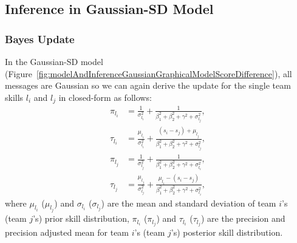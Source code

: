 \subsection{Inference in Gaussian-SD Model}

\subsubsection{Bayes Update} 
In the Gaussian-SD model
(Figure~\ref{fig:modelAndInferenceGaussianGraphicalModelScoreDifference}),
all messages are Gaussian so we can again derive the update
for the single team skills $l_i$ and $l_j$ in closed-form
as follows:
\begin{align}
  \pi_{l_{i}}  &=  \frac{1}{\sigma_{l_{i}}^2} + \frac{1}{\beta_1^2+\beta_2^2+\gamma^2+\sigma_{l_{j}}^2},  \nonumber \\
  \tau_{l_{i}} &=    \frac{\mu_{l_{i}}}{\sigma_{l_{i}}^2} + \frac{(s_i-s_j)+\mu_{l_{j}}}{\beta_1^2+\beta_2^2+\gamma^2+\sigma_{l_{j}}^2}, \nonumber    \\
  \pi_{l_{j}}  &=    \frac{1}{\sigma_{l_{j}}^2} + \frac{1}{\beta_1^2+\beta_2^2+\gamma^2+\sigma_{l_{i}}^2}, \nonumber \\
  \tau_{l_{j}} &=    \frac{\mu_{l_{j}}}{\sigma_{l_{j}}^2} + \frac{\mu_{l_{i}}-(s_i-s_j)}{\beta_1^2+\beta_2^2+\gamma^2+\sigma_{l_{i}}^2},
 \end{align}
where $\mu_{l_i}$ ($\mu_{l_j}$) and $\sigma_{l_i}$
      ($\sigma_{l_j}$) are the mean and standard deviation of team
      $i$'s (team $j$'s) prior skill distribution,
$\pi_{l_{i}}$ ($\pi_{l_{j}}$) and $\tau_{l_{i}}$
      ($\tau_{l_{j}}$) are the precision and precision adjusted mean
      for team $i$'s (team $j$'s) posterior skill distribution.

